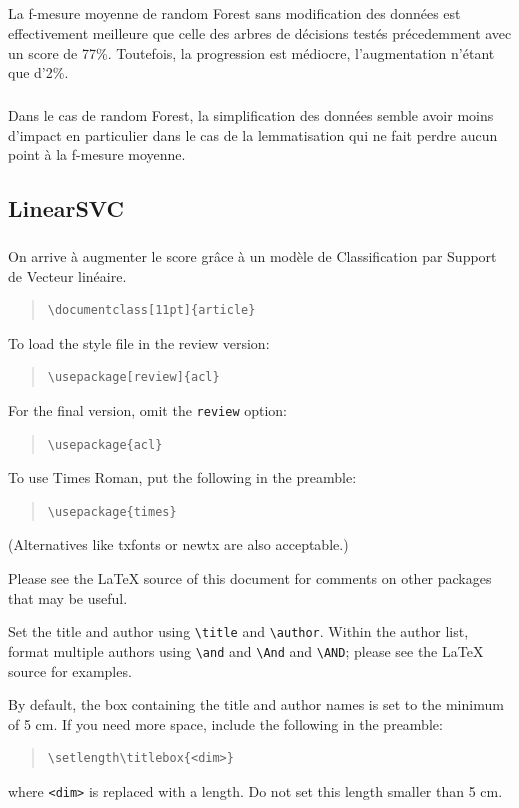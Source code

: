 \documentclass[11pt]{article}
\begin{document}
\subparagraph{}
La f-mesure moyenne de random Forest sans modification des données est effectivement meilleure que celle des arbres de décisions testés précedemment avec un score de 77\%. Toutefois, la progression est médiocre, l'augmentation n'étant que d'2\%.
\subparagraph{}
Dans le cas de random Forest, la simplification des données semble avoir moins d'impact en particulier dans le cas de la lemmatisation qui ne fait perdre aucun point à la f-mesure moyenne.

\subsection{LinearSVC}
\subparagraph{}
On arrive à augmenter le score grâce à un modèle de Classification par Support de Vecteur linéaire.

\begin{quote}
\begin{verbatim}
\documentclass[11pt]{article}
\end{verbatim}
\end{quote}

To load the style file in the review version:
\begin{quote}
\begin{verbatim}
\usepackage[review]{acl}
\end{verbatim}
\end{quote}
For the final version, omit the \verb|review| option:
\begin{quote}
\begin{verbatim}
\usepackage{acl}
\end{verbatim}
\end{quote}

To use Times Roman, put the following in the preamble:
\begin{quote}
\begin{verbatim}
\usepackage{times}
\end{verbatim}
\end{quote}
(Alternatives like txfonts or newtx are also acceptable.)

Please see the \LaTeX{} source of this document for comments on other packages that may be useful.

Set the title and author using \verb|\title| and \verb|\author|. Within the author list, format multiple authors using \verb|\and| and \verb|\And| and \verb|\AND|; please see the \LaTeX{} source for examples.

By default, the box containing the title and author names is set to the minimum of 5 cm. If you need more space, include the following in the preamble:
\begin{quote}
\begin{verbatim}
\setlength\titlebox{<dim>}
\end{verbatim}
\end{quote}
where \verb|<dim>| is replaced with a length. Do not set this length smaller than 5 cm.
\end{document}
